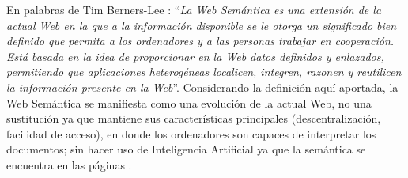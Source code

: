 

En palabras de Tim Berners-Lee \cite{researchgate}: ``\textit{La Web Semántica es una extensión de la actual Web en la que a la información disponible se le otorga un significado bien definido que permita a los ordenadores y a las personas trabajar en cooperación. Está basada en la idea de proporcionar en la Web datos definidos y enlazados, permitiendo que aplicaciones heterogéneas localicen, integren, razonen y reutilicen la información presente en la Web}''. Considerando la definición aquí aportada, la Web Semántica se manifiesta como una evolución de la actual Web, no una sustitución ya que mantiene sus características principales (descentralización, facilidad de acceso), en donde los ordenadores son capaces de interpretar los documentos; sin hacer uso de Inteligencia Artificial ya que la semántica se encuentra en las páginas \cite{semantica-web}. \\


